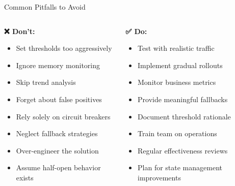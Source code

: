 \documentclass[aspectratio=169]{beamer}
\begin{document}
\begin{frame}{Common Pitfalls to Avoid}
    \begin{columns}
        \begin{column}{0.5\textwidth}
            \textbf{❌ Don't:}
            \begin{itemize}
                \item Set thresholds too aggressively
                \item Ignore memory monitoring
                \item Skip trend analysis
                \item Forget about false positives
                \item Rely solely on circuit breakers
                \item Neglect fallback strategies
                \item Over-engineer the solution
                \item Assume half-open behavior exists
            \end{itemize}
        \end{column}
        \begin{column}{0.5\textwidth}
            \textbf{✅ Do:}
            \begin{itemize}
                \item Test with realistic traffic
                \item Implement gradual rollouts
                \item Monitor business metrics
                \item Provide meaningful fallbacks
                \item Document threshold rationale
                \item Train team on operations
                \item Regular effectiveness reviews
                \item Plan for state management improvements
            \end{itemize}
        \end{column}
    \end{columns}
    
    \vspace{0.5cm}
    \begin{center}
    \end{center}
\end{frame}
\end{document}
